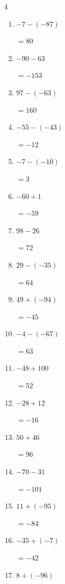 \begin{multicols}{4}
\begin{enumerate}
        $=-16$

  \item $-7-(-87)$

        $=80$

  \item $-90-63$

        $=-153$

  \item $97-(-63)$

        $=160$

  \item $-55-(-43)$

        $=-12$

  \item $-7-(-10)$

        $=3$

\columnbreak %

  \item $-60+1$

        $=-59$

  \item $98-26$

        $=72$

  \item $29-(-35)$

        $=64$

  \item $49+(-94)$

        $=-45$

  \item $-4-(-67)$

        $=63$

  \item $-48+100$

        $=52$

  \item $-28+12$

        $=-16$

  \item $50+46$

        $=96$

  \item $-70-31$

        $=-101$

  \item $11+(-95)$

        $=-84$

  \item $-35+(-7)$

        $=-42$

  \item $8+(-96)$


\end{enumerate}
\end{multicols}
